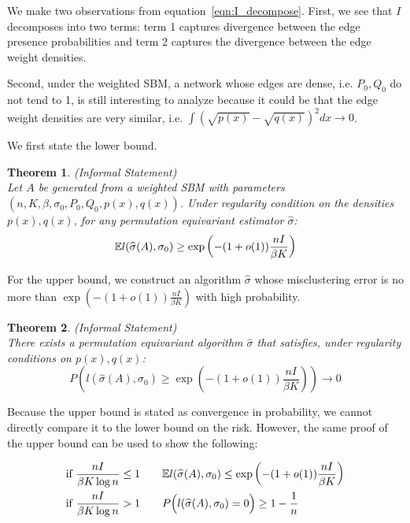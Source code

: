 \documentclass{article}
\newtheorem*{theorem*}{Theorem}
\begin{document}
We make two observations from equation~\ref{eqn:I_decompose}. First, we see that $I$ decomposes into two terms: term 1 captures divergence between the edge presence probabilities and term 2 captures the divergence between the
edge weight densities.

Second, under the weighted SBM, a network whose edges are dense, i.e. $P_0, Q_0$ do not tend to 1, is still interesting to analyze because it could be that the edge weight densities are very similar, i.e. $ \int (\sqrt{p(x)} - \sqrt{q(x)} )^2 dx \rightarrow 0$.




We first state the lower bound.
\begin{theorem*} (Informal Statement) \\
Let $A$ be generated from a weighted SBM with parameters $(n, K, \beta, \sigma_0, P_0, Q_0, p(x), q(x))$. Under regularity condition on the densities $p(x), q(x)$, for any permutation equivariant estimator $\hat{\sigma}$:
\[
  {\mathbb E} l(\widehat{\sigma}(A), \sigma_0) \geq \exp\left( - (1 + o(1)) \frac{n I}{\beta K} \right)
\]
\end{theorem*}

For the upper bound, we construct an algorithm $\hat{\sigma}$ whose misclustering error is no more than $\exp\left( - (1 + o(1)) \frac{ n I}{\beta K} \right)$ with high probability.
\begin{theorem*} (Informal Statement)\\
  There exists a permutation equivariant algorithm $\hat{\sigma}$ that satisfies, under regularity conditions on $p(x), q(x)$:
  \[
    P\left( l(\hat{\sigma}(A), \sigma_0) \geq \exp\left( - (1 + o(1)) \frac{n I}{\beta K} \right) \right) \rightarrow 0
  \]

\end{theorem*}

Because the upper bound is stated as convergence in probability, we cannot directly compare it to the lower bound on the risk. However, the same proof of the upper bound can be used to show the following:

\begin{align*}
  & \textrm{if $\frac{n I}{\beta K \log n}  \leq 1$} \qquad {\mathbb E} l(\widehat{\sigma}(A), \sigma_0) \leq \exp\left( - (1 + o(1)) \frac{n I}{\beta K} \right)  \\
  & \textrm{if $\frac{n I}{\beta K \log n}  > 1$} \qquad P\Big( l(\widehat{\sigma}(A), \sigma_0) = 0 \Big) \geq 1 - \frac{1}{n} 
\end{align*}
\end{document}
